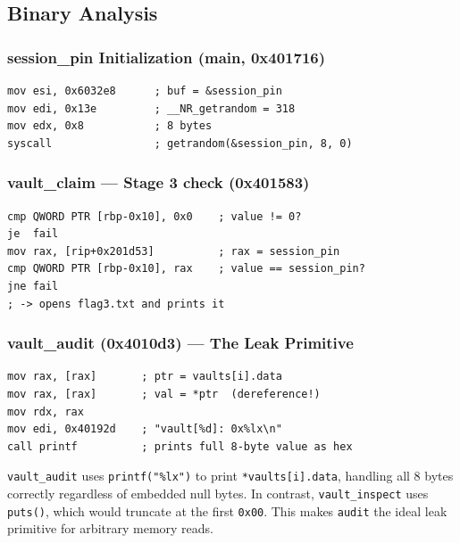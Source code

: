 \documentclass[12pt,a4paper]{article}
\begin{document}
\subsection{Binary Analysis}

\subsubsection{session\_pin Initialization (main, 0x401716)}

\begin{lstlisting}[style=asm, caption={session\_pin is filled with 8 random bytes}]
mov esi, 0x6032e8      ; buf = &session_pin
mov edi, 0x13e         ; __NR_getrandom = 318
mov edx, 0x8           ; 8 bytes
syscall                ; getrandom(&session_pin, 8, 0)
\end{lstlisting}

\subsubsection{vault\_claim — Stage 3 check (0x401583)}

\begin{lstlisting}[style=asm, caption={Stage 3: compares submitted value with session\_pin}]
cmp QWORD PTR [rbp-0x10], 0x0    ; value != 0?
je  fail
mov rax, [rip+0x201d53]          ; rax = session_pin
cmp QWORD PTR [rbp-0x10], rax    ; value == session_pin?
jne fail
; -> opens flag3.txt and prints it
\end{lstlisting}

\subsubsection{vault\_audit (0x4010d3) — The Leak Primitive}

\begin{lstlisting}[style=asm, caption={vault\_audit dereferences data pointer and prints as hex}]
mov rax, [rax]       ; ptr = vaults[i].data
mov rax, [rax]       ; val = *ptr  (dereference!)
mov rdx, rax
mov edi, 0x40192d    ; "vault[%d]: 0x%lx\n"
call printf          ; prints full 8-byte value as hex
\end{lstlisting}

\begin{insight}
\texttt{vault\_audit} uses \texttt{printf("\%lx")} to print
\texttt{*vaults[i].data}, handling all 8 bytes correctly regardless of embedded
null bytes. In contrast, \texttt{vault\_inspect} uses \texttt{puts()}, which
would truncate at the first \texttt{0x00}. This makes \texttt{audit} the
ideal leak primitive for arbitrary memory reads.
\end{insight}
\end{document}
